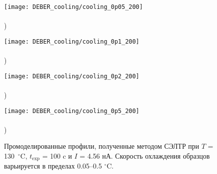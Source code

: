 \begin{figure}[h]
	\begin{minipage}{0.48\textwidth}
		\texttt{[image: DEBER\_cooling/cooling\_0p05\_200]} \\
		\vspace{-13em} \\ ) \\ \vspace{13em}
	\end{minipage}
	\begin{minipage}{0.48\textwidth}
		\texttt{[image: DEBER\_cooling/cooling\_0p1\_200]} \\
		\vspace{-13em} \\ ) \\ \vspace{13em}
	\end{minipage}
	
	\vspace{-3em}
	
	\begin{minipage}{0.48\textwidth}
		\texttt{[image: DEBER\_cooling/cooling\_0p2\_200]} \\
		\vspace{-13em} \\ ) \\ \vspace{13em}
	\end{minipage}
	\begin{minipage}{0.48\textwidth}
		\texttt{[image: DEBER\_cooling/cooling\_0p5\_200]} \\
		\vspace{-13em} \\ ) \\ \vspace{13em}
	\end{minipage}
	\vspace{-3em}
	\caption{Промоделированные профили, полученные методом СЭЛТР при $T$ = 130~$^\circ$C, $t_\mathrm{exp}$ = 100 c и $I$ = 4.56 нА. Скорость охлаждения образцов варьируется в пределах 0.05--0.5 $^\circ$C.}
	\label{fig:DEBER_cooling}
	\vspace{1em}
\end{figure}

